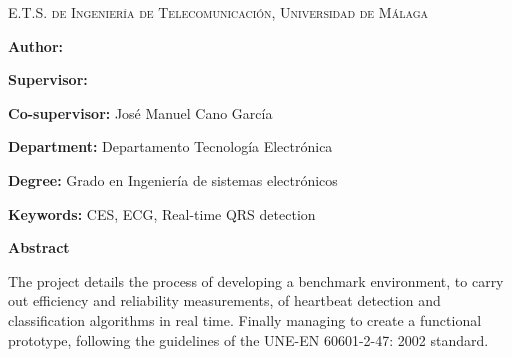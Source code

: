 
\pagestyle{fancy}

\begin{center}
	\scshape
	E.T.S. de Ingeniería de Telecomunicación, Universidad de Málaga
\end{center}

\bigskip

\begin{center}
	\Large \scshape
	\textbf{\tfgtitlenameENG}
\end{center}

\bigskip \bigskip \bigskip

\begin{minipage}{\textwidth}

\textbf{Author:} \tfgauthorname

\medskip

\textbf{Supervisor:} \tfgtutorname

\medskip

\textbf{Co-supervisor:} José Manuel Cano García

\medskip

\textbf{Department:} Departamento Tecnología Electrónica

\medskip

\textbf{Degree:} Grado en Ingeniería de sistemas electrónicos

\medskip

\textbf{Keywords:} CES, ECG, Real-time QRS detection

\bigskip \bigskip


\end{minipage}

\begin{center}
	\textbf{Abstract}
\end{center}

The project details the process of developing a benchmark environment, to carry out efficiency and reliability measurements, of heartbeat detection and classification algorithms in real time. Finally managing to create a functional prototype, following the guidelines of the UNE-EN 60601-2-47: 2002 standard.
\blankpage
